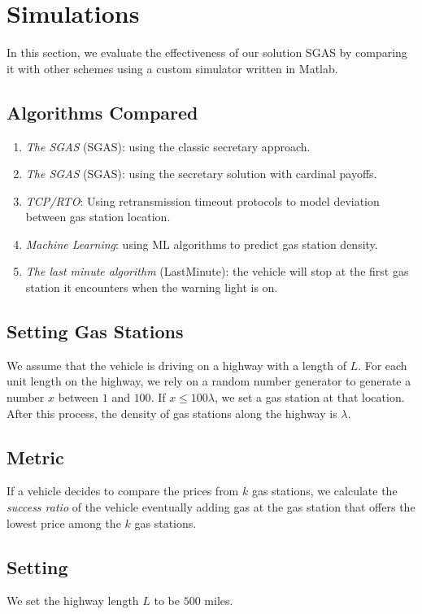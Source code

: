 \documentclass[conference]{IEEEtran}
\theoremstyle{definition}
\begin{document}
\section{Simulations} \label{simulations}
In this section, we evaluate the effectiveness of our solution SGAS by comparing it with other schemes using a custom simulator written in Matlab.

\subsection{Algorithms Compared}
\begin{enumerate}
\item {\em The SGAS} (SGAS): using the classic secretary approach.
\item {\em The SGAS} (SGAS): using the secretary solution with cardinal payoffs.
\item {\em TCP/RTO}: Using retransmission timeout protocols to model deviation between gas station location.
\item {\em Machine Learning}: using ML algorithms to predict gas station density.
\item {\em The last minute algorithm} (LastMinute):  the vehicle will stop at the first gas station it encounters when the warning light is on.

\end{enumerate}

\subsection{Setting Gas Stations}
We assume that the vehicle is driving on a highway with a length of $L$. For each unit length on the highway,  we rely on a random number generator to generate a number $x$ between $1$ and $100$. If $x \leq 100\lambda$, we set a gas station at that location. After this process, the density of gas stations along the highway is $\lambda$.

\subsection{Metric}
If a vehicle decides to compare the prices from $k$ gas stations, we calculate the {\em success ratio} of the vehicle eventually adding gas at the gas station that offers the lowest price among the $k$ gas stations.

\subsection{Setting}
We set the highway length $L$ to be $500$ miles.
\end{document}
